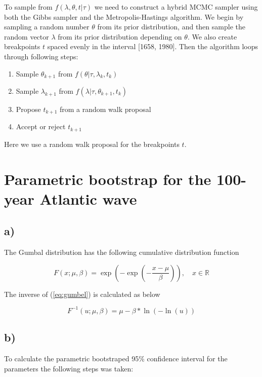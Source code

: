 \documentclass[a4paper]{article}
\begin{document}
To sample from $f(\lambda, \theta, t | \tau)$ we need to construct a hybrid MCMC sampler using both the Gibbs sampler and the Metropolis-Hastings algorithm. We begin by sampling a random number $\theta$ from its prior distribution, and then sample the random vector \textbf{$\lambda$} from its prior distribution depending on $\theta$. We also create breakpoints $t$ spaced evenly in the interval [1658, 1980]. Then the algorithm loops through following steps:
\begin{enumerate}
    \item Sample $\theta_{k+1}$ from $f(\theta|\tau, \lambda_k, t_k)$
    \item Sample $\lambda_{k+1}$ from $f(\lambda|\tau, \theta_{k+1}, t_k)$
    \item Propose $t_{k+1}$ from a random walk proposal
    \item Accept or reject $t_{k+1}$
\end{enumerate}

Here we use a random walk proposal for the breakpoints $t$.

\newpage

\section{Parametric bootstrap for the 100-year Atlantic wave}

\subsection*{a)}

The Gumbal distribution has the following cumulative distribution function

\begin{equation}
    F(x; \mu, \beta) = \exp\left(-\exp\left(-\frac{x-\mu}{\beta}\right)\right), \quad x \in \mathbb{R}
    \label{eq:gumbel}
\end{equation}

The inverse of (\ref{eq:gumbel}) is calculated as below

\begin{equation}
    F^{-1}(u; \mu, \beta) = \mu - \beta*\ln(-\ln(u))
    \label{eq:inv_gumbel}
\end{equation}

\subsection*{b)}

To calculate the parametric bootstraped 95\% confidence interval for the parameters the following steps was taken:
\end{document}
